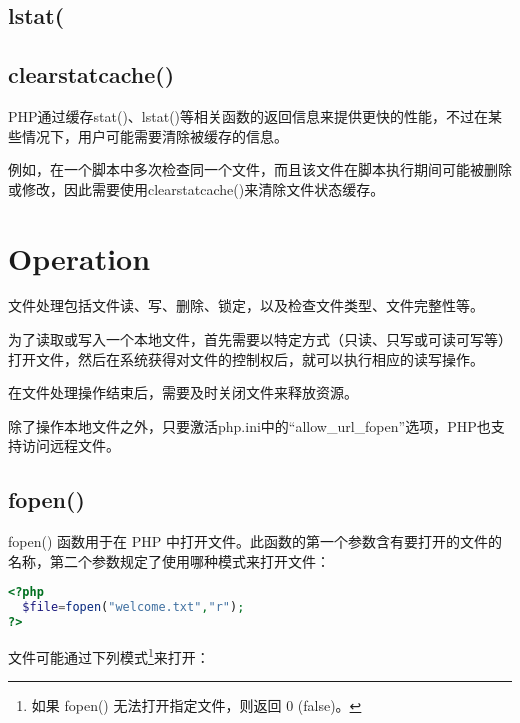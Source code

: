\subsection{lstat(}


\subsection{clearstatcache()}


PHP通过缓存stat()、lstat()等相关函数的返回信息来提供更快的性能，不过在某些情况下，用户可能需要清除被缓存的信息。


例如，在一个脚本中多次检查同一个文件，而且该文件在脚本执行期间可能被删除或修改，因此需要使用clearstatcache()来清除文件状态缓存。

\section{Operation}


文件处理包括文件读、写、删除、锁定，以及检查文件类型、文件完整性等。


为了读取或写入一个本地文件，首先需要以特定方式（只读、只写或可读可写等）打开文件，然后在系统获得对文件的控制权后，就可以执行相应的读写操作。


在文件处理操作结束后，需要及时关闭文件来释放资源。


除了操作本地文件之外，只要激活php.ini中的“allow\_url\_fopen”选项，PHP也支持访问远程文件。





\subsection{fopen()}




fopen() 函数用于在 PHP 中打开文件。此函数的第一个参数含有要打开的文件的名称，第二个参数规定了使用哪种模式来打开文件：

\begin{lstlisting}[language=PHP]
<?php
  $file=fopen("welcome.txt","r");
?>
\end{lstlisting}

文件可能通过下列模式\footnote{如果 fopen() 无法打开指定文件，则返回 0 (false)。}来打开：


